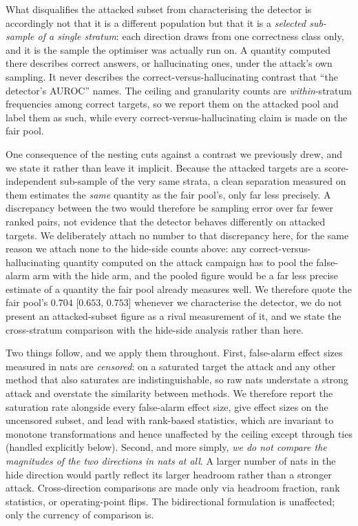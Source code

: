 What disqualifies the attacked subset from characterising the detector is accordingly not
that it is a different population but that it is a \emph{selected sub-sample of a single
stratum}: each direction draws from one correctness class only, and it is the sample the
optimiser was actually run on. A quantity computed there describes correct answers, or hallucinating ones,
under the attack's own sampling. It never describes the correct-versus-hallucinating contrast
that ``the detector's AUROC'' names. The ceiling and granularity counts are \emph{within}-stratum
frequencies among correct targets, so we report them on the attacked pool and label them as
such, while every correct-versus-hallucinating claim is made on the fair pool.

One consequence of the nesting cuts against a contrast we previously drew, and we state it
rather than leave it implicit. Because the attacked targets are a score-independent
sub-sample of the very same strata, a clean separation measured on them estimates the
\emph{same} quantity as the fair pool's, only far less precisely. A discrepancy between
the two would therefore be sampling error over far fewer ranked pairs, not evidence that the
detector behaves differently on attacked targets. We deliberately attach no number to that
discrepancy here, for the same reason we attach none to the hide-side counts above: any
correct-versus-hallucinating quantity computed on the attack campaign has to pool the
false-alarm arm with the hide arm, and the pooled figure would be a far less precise estimate
of a quantity the fair pool already measures well. We therefore quote the fair pool's $0.704$
[$0.653$, $0.753$] whenever we characterise the detector, we do not present an
attacked-subset figure as a rival measurement of it, and we state the cross-stratum
comparison with the hide-side analysis rather than here.

Two things follow, and we apply them throughout. First, false-alarm effect sizes measured in
nats are \emph{censored}: on a saturated target the attack and any other method that also
saturates are indistinguishable, so raw nats understate a strong attack and overstate the
similarity between methods. We therefore report the saturation rate alongside every
false-alarm effect size, give effect sizes on the uncensored subset, and lead with
rank-based statistics, which are invariant to monotone transformations and hence unaffected
by the ceiling except through ties (handled explicitly below). Second, and more simply,
\emph{we do not compare the magnitudes of the two directions in nats at all}. A larger
number of nats in the hide direction would partly reflect its larger headroom rather than a
stronger attack. Cross-direction comparisons are made only via headroom fraction, rank
statistics, or operating-point flips. The bidirectional formulation is unaffected; only the
currency of comparison is.

